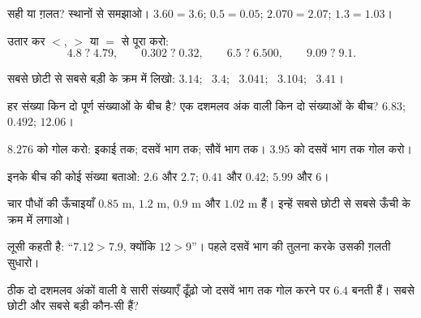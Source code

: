 \begin{exercise}[$\star$]\label{exo:g5:decimals:3}
सही या ग़लत? स्थानों से समझाओ।
$3.60 = 3.6$; \quad $0.5 = 0.05$; \quad $2.070 = 2.07$; \quad
$1.3 = 1.03$।
\end{exercise}

\begin{exercise}[$\star$]\label{exo:g5:decimals:4}
उतार कर $<$, $>$ या $=$ से पूरा करो:
\[
4.8 \;?\; 4.79, \qquad
0.302 \;?\; 0.32, \qquad
6.5 \;?\; 6.500, \qquad
9.09 \;?\; 9.1 .
\]
\end{exercise}

\begin{exercise}[$\star$]\label{exo:g5:decimals:5}
सबसे छोटी से सबसे बड़ी के क्रम में लिखो: $3.14$; \ $3.4$; \ $3.041$; \
$3.104$; \ $3.41$।
\end{exercise}

\begin{exercise}[$\star$]\label{exo:g5:decimals:6}
हर संख्या किन दो पूर्ण संख्याओं के बीच है? एक दशमलव अंक वाली किन
दो संख्याओं के बीच? \quad $6.83$; \quad $0.492$; \quad
$12.06$।
\end{exercise}

\begin{exercise}[$\star$]\label{exo:g5:decimals:7}
$8.276$ को गोल करो: इकाई तक; दसवें भाग तक; सौवें भाग तक।
$3.95$ को दसवें भाग तक गोल करो।
\end{exercise}

\begin{exercise}[$\star$]\label{exo:g5:decimals:8}
इनके बीच की कोई संख्या बताओ: $2.6$ और $2.7$; \quad $0.41$ और
$0.42$; \quad $5.99$ और $6$।
\end{exercise}

\begin{exercise}[$\star$]\label{exo:g5:decimals:9}
चार पौधों की ऊँचाइयाँ $0.85$ m, $1.2$ m, $0.9$ m और $1.02$ m
हैं। इन्हें सबसे छोटी से सबसे ऊँची के क्रम में लगाओ।
\end{exercise}

\begin{exercise}[$\star\star$]\label{exo:g5:decimals:10}
लूसी कहती है: ``$7.12 > 7.9$, क्योंकि $12 > 9$''। पहले दसवें भाग
की तुलना करके उसकी ग़लती सुधारो।
\end{exercise}

\begin{exercise}[$\star\star$]\label{exo:g5:decimals:11}
ठीक दो दशमलव अंकों वाली वे सारी संख्याएँ ढूँढ़ो जो दसवें भाग तक
गोल करने पर $6.4$ बनती हैं। सबसे छोटी और सबसे बड़ी कौन-सी
हैं?
\end{exercise}
